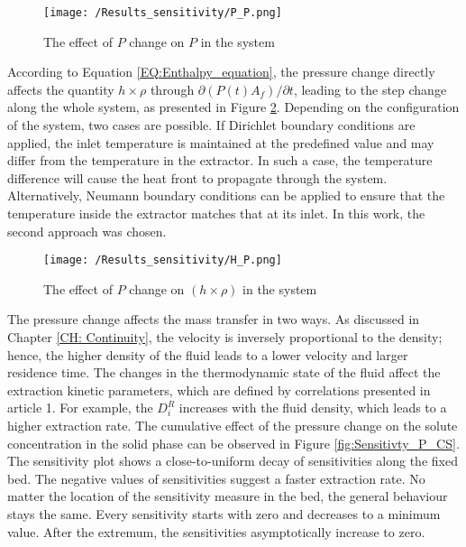 \documentclass[../Article_Sensitivity_Analsysis.tex]{subfiles}
\begin{document}
    \begin{figure}[h!]
    	\centering
    	\texttt{[image: /Results\_sensitivity/P\_P.png]}
    	\caption{The effect of $P$ change on $P$ in the system}
    	\label{fig:Sensitivty_P_P}
    \end{figure}
    
	According to Equation \ref{EQ:Enthalpy_equation}, the pressure change directly affects the quantity $h \times \rho$ through $\partial (P(t) A_f) / \partial t$, leading to the step change along the whole system, as presented in Figure \ref{fig:Sensitivty_P_H}. Depending on the configuration of the system, two cases are possible. If Dirichlet boundary conditions are applied, the inlet temperature is maintained at the predefined value and may differ from the temperature in the extractor. In such a case, the temperature difference will cause the heat front to propagate through the system. Alternatively, Neumann boundary conditions can be applied to ensure that the temperature inside the extractor matches that at its inlet. In this work, the second approach was chosen.
    
    \begin{figure}[h!]
    	\centering
    	\texttt{[image: /Results\_sensitivity/H\_P.png]}
    	\caption{The effect of $P$ change on $(h \times \rho)$ in the system}
    	\label{fig:Sensitivty_P_H}
    \end{figure}

	The pressure change affects the mass transfer in two ways. As discussed in Chapter \ref{CH: Continuity}, the velocity is inversely proportional to the density; hence, the higher density of the fluid leads to a lower velocity and larger residence time. The changes in the thermodynamic state of the fluid affect the extraction kinetic parameters, which are defined by correlations presented in {\color{red}article 1}. For example, the $D_i^R$ increases with the fluid density, which leads to a higher extraction rate. The cumulative effect of the pressure change on the solute concentration in the solid phase can be observed in Figure \ref{fig:Sensitivty_P_CS}. The sensitivity plot shows a close-to-uniform decay of sensitivities along the fixed bed. The negative values of sensitivities suggest a faster extraction rate. No matter the location of the sensitivity measure in the bed, the general behaviour stays the same. Every sensitivity starts with zero and decreases to a minimum value. After the extremum, the sensitivities asymptotically increase to zero.
\end{document}
